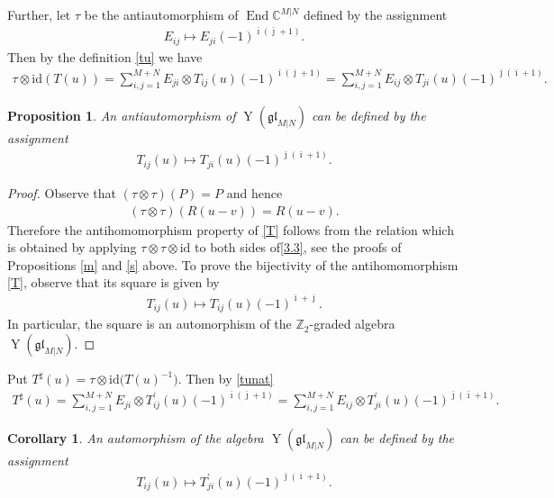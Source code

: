 \documentclass[10pt,a4paper]{amsart}
\numberwithin{equation}{section}
\newtheorem{Corollary}[Theorem]{Corollary}
\newtheorem{Proposition}[Theorem]{Proposition}
\def\bi{{\bar\imath }}
\def\bj{{\bar\jmath }}
\def\CC{{\mathbb{C}}}
\def\CMN{\CC^{M|N}}
\def\End{\operatorname{End}}
\def\glMN{\mathfrak{gl}_{M|N}}
\def\id{{\mathrm{id}}}
\def\ot{\otimes}
\def\TP{T^{\prime}}
\def\TS{T^{\sharp}}
\def\YMN{\operatorname{Y}(\glMN)}
\def\ZZ{\mathbb{Z}}
\begin{document}
Further, let $\tau$ be the antiautomorphism of $\End\CMN$
defined by the assignment
\begin{gather*}
E_{ij}\mapsto E_{ji} {(-1)}^{\bi ( \bj + 1)} .
\end{gather*}
Then by the definition \eqref{tu} we have
\begin{gather*}
\tau \ot\id ( T(u) )=
\sum_{i,j=1}^{M+N} E_{ji}\ot T_{ij}(u)
{(-1)}^{\bi ( \bj + 1)}=
\sum_{i,j=1}^{M+N} E_{ij}\ot T_{ji}(u)
{(-1)}^{\bj ( \bi + 1)} .
\end{gather*}

\begin{Proposition}
An antiautomorphism of %
$\YMN$ can be defined by the assignment
\begin{gather}
\label{T}
T_{ij}(u)\mapsto T_{ji}(u)
{(-1)}^{\bj ( \bi + 1)} .
\end{gather}
\end{Proposition}

\begin{proof}
Observe that $(\tau\ot\tau)(P)=P$ and hence
\begin{gather}
\label{Rtt}
(\tau\ot\tau)(R(u-v))=R(u-v) .
\end{gather}
Therefore the antihomomorphism property of \eqref{T}
follows from the relation which is obtained by applying
$\tau\ot\tau\ot\id$ to both sides of\eqref{3.3},
see the proofs of Propositions \ref{m} and \ref{s} above.
To prove the bijectivity of
the antihomomorphism \eqref{T}, observe
that its square is given by %
\begin{gather*}
T_{ij}(u)\mapsto T_{ij}(u)
{(-1)}^{\bi+ \bj} .
\end{gather*}
In particular, the square is an automorphism of the $\ZZ_2$-graded
algebra $\YMN $.
\end{proof}

Put
$\TS(u)=\tau \ot\id \big( T(u)^{-1} \big) $.
Then by \eqref{tunat}
\begin{gather}\label{tsu}
\TS(u)=
\sum_{i,j=1}^{M+N} E_{ji}\ot\TP_{ij}(u)
{(-1)}^{\bi ( \bj + 1)}=
\sum_{i,j=1}^{M+N} E_{ij}\ot\TP_{ji}(u)
{(-1)}^{\bj ( \bi + 1)} .
\end{gather}

\begin{Corollary}
\label{ts}
An automorphism of the algebra $\YMN$ can be defined by the assignment
\begin{gather}
\label{tusharp}
T_{ij}(u)\mapsto\TP_{ji}(u)
{(-1)}^{\bj ( \bi + 1)} .
\end{gather}
\end{Corollary}
\end{document}
